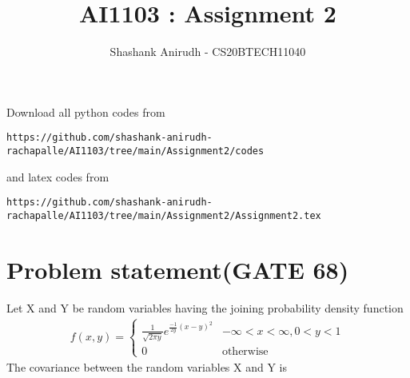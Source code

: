 \documentclass[journal,12pt,twocolumn]{IEEEtran}
\begin{document}
     \def\rightbox#1{\makebox[0in][r]{#1}}
     \def\centbox#1{\makebox[0in]{#1}}
     \def\topbox#1{\raisebox{-\baselineskip}[0in][0in]{#1}}
     \def\midbox#1{\raisebox{-0.5\baselineskip}[0in][0in]{#1}}
\vspace{3cm}
\title{AI1103 : Assignment 2}
\author{Shashank Anirudh - CS20BTECH11040}
\maketitle
\newpage
\bigskip
\renewcommand{\thefigure}{\theenumi}
\renewcommand{\thetable}{\theenumi}
Download all python codes from 
\begin{lstlisting}
https://github.com/shashank-anirudh-rachapalle/AI1103/tree/main/Assignment2/codes
\end{lstlisting}
%
and latex codes from 
%
\begin{lstlisting}
https://github.com/shashank-anirudh-rachapalle/AI1103/tree/main/Assignment2/Assignment2.tex
\end{lstlisting}
\section*{\textbf{Problem statement(GATE 68)}}
Let X and Y be random variables having the joining probability density function
\begin{align*}
f(x,y)=
\begin{cases}
\frac{1}{\sqrt{2\pi y}}e^{\frac{-1}{2y}(x-y)^2} &-\infty<x<\infty,0<y<1\\
0 &\text{otherwise}
\end{cases}
\end{align*}
The covariance between the random variables X and Y is\\
\end{document}
